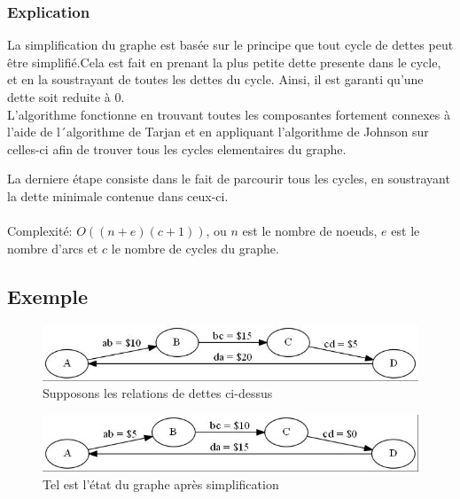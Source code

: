 \documentclass[12pt, oneside]{article}
\begin{document}
\subsubsection{Explication}
La simplification du graphe est basée sur le principe que tout cycle de dettes peut être simplifié.Cela est fait en prenant la plus petite dette presente dans le cycle, et en la soustrayant de toutes les dettes du cycle. Ainsi, il est garanti qu'une dette soit reduite à 0.\\

L'algorithme fonctionne en trouvant toutes les composantes fortement connexes à l'aide de l´algorithme de Tarjan et en appliquant l'algorithme de Johnson sur celles-ci afin de trouver tous les cycles elementaires du graphe.

La derniere étape consiste dans le fait de parcourir tous les cycles, en soustrayant la dette minimale contenue dans ceux-ci.\\\\
Complexité: $O((n + e)(c + 1))$, ou $n$ est le nombre de noeuds, $e$ est le nombre d'arcs et $c$ le nombre de cycles du graphe.

\FloatBarrier
\subsection{Exemple}
\begin{figure}[!h]
    \includegraphics[trim=3 3 3 3,clip]{2_1_0}
    \caption{Supposons les relations de dettes ci-dessus}
\end{figure}

\begin{figure}[!h]
    \includegraphics[trim=3 3 3 3,clip]{2_1_Simplified}
    \caption{Tel est l'état du graphe après simplification}
\end{figure}

\newpage
\end{document}
